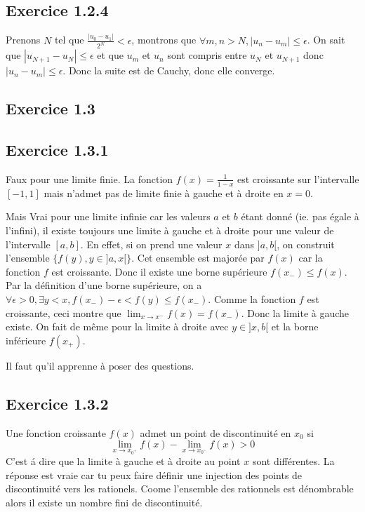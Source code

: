 \documentclass[]{book}
\theoremstyle{definition}
\begin{document}
\subsection*{Exercice 1.2.4}
Prenons $N$ tel que $\frac{|u_0-u_1|}{2^{N}} < \epsilon$, montrons que $\forall m,n > N, |u_n-u_m| \leq \epsilon$. On sait que $|u_{N+1}-u_N| \leq \epsilon$ et que $u_m$ et $u_n$ sont compris entre $u_{N}$ et $u_{N+1}$ donc $|u_n - u_m| \leq \epsilon$. Donc la suite est de Cauchy, donc elle converge.

\subsection*{Exercice 1.3}
\subsection*{Exercice 1.3.1}
Faux pour une limite finie. La fonction $f(x) = \frac{1}{1-x}$ est croissante sur l'intervalle $[-1,1]$ mais n'admet pas de limite finie \`a gauche et \`a droite en $x=0$.

Mais Vrai pour une limite infinie car les valeurs $a$ et $b$ \'etant donn\'e (ie. pas \'egale \`a l'infini), il existe toujours une limite \`a gauche et \`a droite pour une valeur de l'intervalle $[a,b]$. En effet, si on prend une valeur $x$ dans $]a,b[$, on construit l'ensemble $\{f(y), y \in ]a,x[\}$. Cet ensemble est major\'ee par $f(x)$ car la fonction $f$ est croissante. Donc il existe une borne sup\'erieure $f(x_{-}) \leq f(x)$. Par la d\'efinition d'une borne sup\'erieure, on a $\forall \epsilon>0, \exists y < x, f(x_{-})-\epsilon < f(y) \leq f(x_{-})$. Comme la fonction $f$ est croissante, ceci montre que $\lim_{x \to x^{-}} f(x) = f(x_{-})$. Donc la limite \`a gauche existe. On fait de m\^eme pour la limite \`a droite avec $y \in ]x,b[$ et la borne inf\'erieure $f(x_{+})$.

Il faut qu'il apprenne \`a poser des questions.

\subsection*{Exercice 1.3.2}
Une fonction croissante $f(x)$ admet un point de discontinuit\'e en $x_0$ si 
$$\lim_{x \to x_{0^{+}}}f(x) - \lim_{x \to x_{0^{-}}}f(x) > 0$$
C'est \'a dire que la limite \`a gauche et \`a droite au point $x$ sont diff\'erentes.
La r\'eponse est vraie car tu peux faire d\'efinir une injection des points de discontinuit\'e vers les rationels. Coome l'ensemble des rationnels est d\'enombrable alors il existe un nombre fini de discontinuit\'e.
\end{document}
